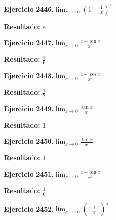 \documentclass[10pt,a4paper]{article}
\begin{document}
\begin{ejbox}
\textbf{Ejercicio 2446.}\quad $\lim_{x\to \infty} \left(1+\frac{1}{x}\right)^x$
\end{ejbox}

\begin{solbox}
\textbf{Resultado:} \(\displaystyle e\)
\end{solbox}

\begin{ejbox}
\textbf{Ejercicio 2447.}\quad $\lim_{x\to 0} \frac{x-\sin x}{x^3}$
\end{ejbox}

\begin{solbox}
\textbf{Resultado:} \(\displaystyle \frac{1}{6}\)
\end{solbox}

\newpage
\begin{ejbox}
\textbf{Ejercicio 2448.}\quad $\lim_{x\to 0} \frac{1-\cos x}{x^2}$
\end{ejbox}

\begin{solbox}
\textbf{Resultado:} \(\displaystyle \frac{1}{2}\)
\end{solbox}

\begin{ejbox}
\textbf{Ejercicio 2449.}\quad $\lim_{x\to 0} \frac{\tan x}{x}$
\end{ejbox}

\begin{solbox}
\textbf{Resultado:} \(\displaystyle 1\)
\end{solbox}

\begin{ejbox}
\textbf{Ejercicio 2450.}\quad $\lim_{x\to 0} \frac{\tan x}{x}$
\end{ejbox}

\begin{solbox}
\textbf{Resultado:} \(\displaystyle 1\)
\end{solbox}

\newpage
\begin{ejbox}
\textbf{Ejercicio 2451.}\quad $\lim_{x\to 0} \frac{x-\sin x}{x^3}$
\end{ejbox}

\begin{solbox}
\textbf{Resultado:} \(\displaystyle \frac{1}{6}\)
\end{solbox}

\begin{ejbox}
\textbf{Ejercicio 2452.}\quad $\lim_{x\to \infty} \left(\frac{x+5}{x}\right)^{x}$
\end{ejbox}
\end{document}
